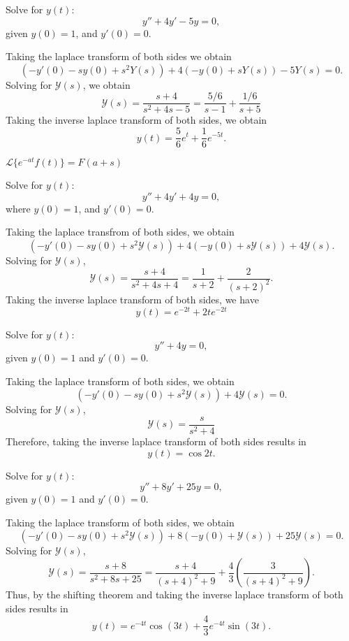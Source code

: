 \begin{example}
    Solve for $y(t)$:
    $$y''+4y'-5y=0,$$
    given $y(0)=1$, and $y'(0)=0$.
\end{example}
\begin{soln}
    Taking the laplace transform of both sides we obtain
    $$\left( -y'(0)-sy(0)+s^2Y(s)\right)+4\left( -y(0)+sY(s)\right)-5Y(s)=0.$$
    Solving for $\mathcal{Y}(s)$, we obtain
    $$\mathcal{Y}(s) = \frac{s+4}{s^2+4s-5} = \frac{5/6}{s-1}+\frac{1/6}{s+5}$$
    Taking the inverse laplace transform of both sides, we obtain
    $$y(t) = \frac{5}{6}e^t+\frac{1}{6}e^{-5t}.$$
\end{soln}
\begin{theorem}
    $\mathcal{L}\{e^{-at}f(t)\} = F(a+s)$
\end{theorem}

\begin{example}
    Solve for $y(t)$:
    $$y''+4y'+4y = 0,$$
    where $y(0) = 1$, and $y'(0) = 0$.
\end{example}
\begin{soln}
    Taking the laplace transfrom of both sides, we obtain
    $$\left(-y'(0)-sy(0)+s^2\mathcal{Y}(s)\right)+4\left(-y(0)+s\mathcal{Y}(s)\right)+4\mathcal{Y}(s).$$
    Solving for $\mathcal{Y}(s)$,
    $$\mathcal{Y}(s) = \frac{s+4}{s^2+4s+4} = \frac{1}{s+2}+\frac{2}{(s+2)^2}.$$
    Taking the inverse laplace transform of both sides, we have
    $$y(t) = e^{-2t}+2te^{-2t}$$
\end{soln}

\begin{example}
    Solve for $y(t)$:
    $$y''+4y=0,$$
    given $y(0)=1$ and $y'(0)=0$.
\end{example}
\begin{soln}
    Taking the laplace transform of both sides, we obtain
    $$\left( -y'(0)-sy(0)+s^2\mathcal{Y}(s)\right)+4\mathcal{Y}(s) = 0.$$
    Solving for $\mathcal{Y}(s)$,
    $$\mathcal{Y}(s) = \frac{s}{s^2+4}$$
    Therefore, taking the inverse laplace transform of both sides results in
    $$y(t) = \cos 2t.$$
\end{soln}

\begin{example}
    Solve for $y(t)$:
    $$y''+8y'+25y=0,$$
    given $y(0)=1$ and $y'(0)=0$.
\end{example}
\begin{soln}
    Taking the laplace transform of both sides, we obtain
    $$\left(-y'(0)-sy(0)+s^2\mathcal{Y}(s)\right)+8\left( -y(0)+\mathcal{Y}(s)\right)+25\mathcal{Y}(s)=0.$$
    Solving for $\mathcal{Y}(s)$,
    $$\mathcal{Y}(s) = \frac{s+8}{s^2+8s+25} = \frac{s+4}{(s+4)^2+9}+\frac{4}{3}\left(\frac{3}{(s+4)^2+9}\right).$$
    Thus, by the \alert{shifting theorem} and taking the inverse laplace transform of
    both sides results in
    $$y(t) = e^{-4t}\cos(3t) + \frac{4}{3}e^{-4t}\sin(3t).$$
\end{soln}

